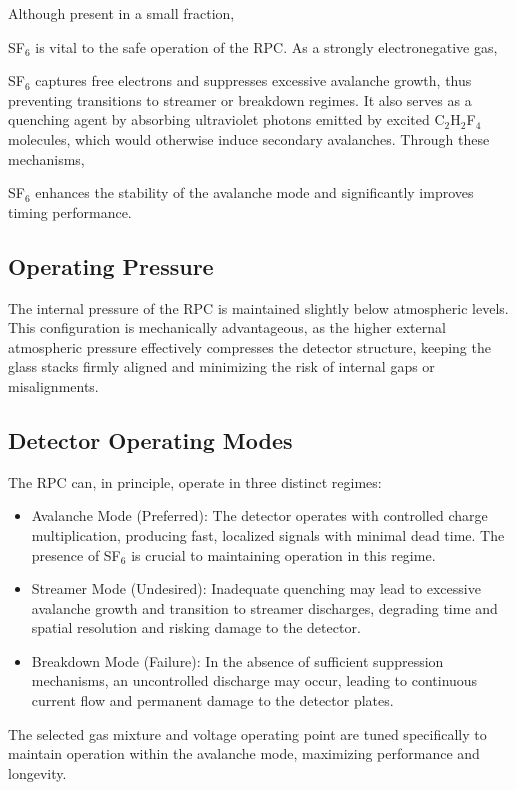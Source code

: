 Although present in a small fraction, {SF$_6$ is vital to the safe operation of the \gls{RPC}. As a strongly electronegative gas, {SF$_6$ captures free electrons and suppresses excessive avalanche growth, thus preventing transitions to streamer or breakdown regimes. It also serves as a quenching agent by absorbing ultraviolet photons emitted by excited C$_2$H$_2$F$_4$ molecules, which would otherwise induce secondary avalanches. Through these mechanisms, {SF$_6$ enhances the stability of the avalanche mode and significantly improves timing performance.

\subsection{Operating Pressure}

The internal pressure of the \gls{RPC} is maintained slightly below atmospheric levels. This configuration is mechanically advantageous, as the higher external atmospheric pressure effectively compresses the detector structure, keeping the glass stacks firmly aligned and minimizing the risk of internal gaps or misalignments.

\subsection{Detector Operating Modes}

The \gls{RPC} can, in principle, operate in three distinct regimes:

\begin{itemize}
	\item Avalanche Mode (Preferred): The detector operates with controlled charge multiplication, producing fast, localized signals with minimal dead time. The presence of SF$_6$ is crucial to maintaining operation in this regime.
	\item Streamer Mode (Undesired): Inadequate quenching may lead to excessive avalanche growth and transition to streamer discharges, degrading time and spatial resolution and risking damage to the detector.
	\item Breakdown Mode (Failure): In the absence of sufficient suppression mechanisms, an uncontrolled discharge may occur, leading to continuous current flow and permanent damage to the detector plates.
\end{itemize}

The selected gas mixture and voltage operating point are tuned specifically to maintain operation within the avalanche mode, maximizing performance and longevity.


}}}

